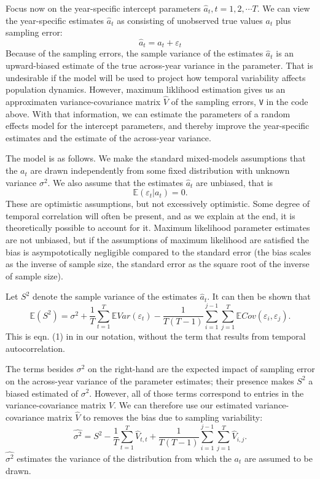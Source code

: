 \documentclass[11pt]{article}
\newcommand{\be}{\begin{equation}}
\newcommand{\ee}{\end{equation}}
\begin{document}
{Focus now on the year-specific intercept parameters $\hat{a}_t, t = 1,2,\cdots T$. 
We can view the year-specific estimates $\hat{a}_t$ as consisting of unobserved true values $a_t$ plus sampling error:
\be
\hat{a}_t= a_t + \varepsilon_t 
\ee
Because of the sampling errors, the sample variance of
the estimates $\hat{a}_t$ is an upward-biased estimate of the true across-year variance in the parameter. 
That is undesirable if the model will be used to project how temporal variability affects population dynamics. 
However, maximum liklihood estimation gives us an approximaten variance-covariance matrix $\hat{V}$ of the
sampling errors, \texttt{V} in the code above. With that information, we can estimate the parameters
of a random effects model for the intercept parameters, and thereby improve the year-specific estimates and
the estimate of the across-year variance.  

The model is as follows. We make the standard mixed-models assumptions that the $a_t$ are drawn 
independently from some fixed distribution with unknown variance $\sigma^2$. We also assume that the estimates 
$\hat{a}_t$ are unbiased, that is
\be
\mathbb{E}(\varepsilon_t \vert a_t) = 0.    
\ee
These are optimistic assumptions, but not excessively optimistic. Some degree of temporal correlation will often be
present, and as we explain at the end, it is theoretically possible to account for it. 
Maximum likelihood parameter estimates are not unbiased, but if the assumptions
of maximum likelihood are satisfied the bias is asympototically negligible compared to the standard error (the 
bias scales as the inverse of sample size, the standard error as the square root of the inverse of sample size).  

Let $S^2$ denote the sample variance of the estimates $\hat{a}_t$. It can then be shown that 
\be
\mathbb{E}(S^2) = \sigma^2  + \frac{1}{T}\sum\limits_{t=1}^T \mathbb{E} Var(\varepsilon_t) 
- \frac{1}{T(T-1)}\sum\limits_{i=1}^{j-1} \sum\limits_{j=1}^T \mathbb{E}Cov(\varepsilon_i, \varepsilon_j). 
\label{eqn:biasTerms}
\ee
This is eqn. (1) in \citet{gould-nichols-1998} in our notation, without the term that 
results from temporal autocorrelation. 

The terms besides $\sigma^2$ on the right-hand are the expected impact of sampling error on the across-year variance
of the parameter estimates; their presence makes $S^2$ a biased estimated of $\sigma^2$. However,
all of those terms correspond to entries in the variance-covariance matrix $V$. We can therefore use our estimated
variance-covariance matrix $\hat{V}$ to removes the bias due to sampling variability: 
\be
\hat{\sigma^2}  = S^2 - \frac{1}{T}\sum\limits_{t=1}^T \hat{V}_{t,t} + 
\frac{1}{T(T-1)}\sum\limits_{i=1}^{j-1} \sum\limits_{j=1}^T \hat{V}_{i,j}. 
\label{eqn:hatSigma}
\ee
$\hat{\sigma^2}$ estimates the variance of the distribution from which the $a_t$ are assumed
to be drawn. 

}
\end{document}
